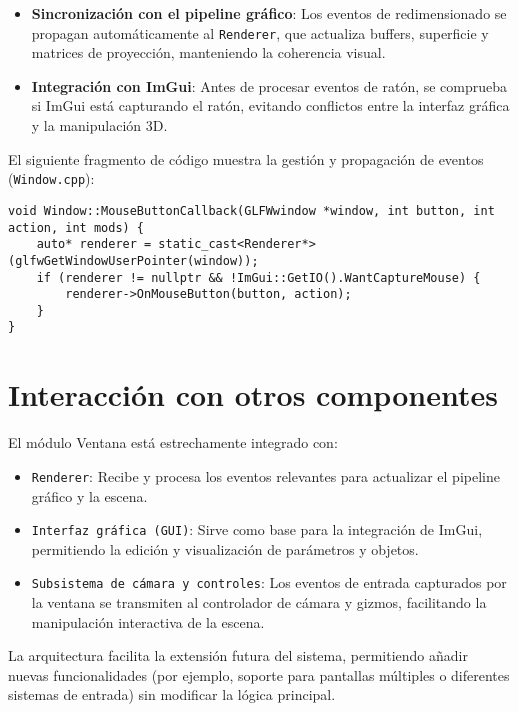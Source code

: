 \begin{itemize}
    \item \textbf{Sincronización con el pipeline gráfico}: Los eventos de redimensionado se propagan automáticamente al \texttt{Renderer}, que actualiza buffers, superficie y matrices de proyección, manteniendo la coherencia visual.
    \item \textbf{Integración con ImGui}: Antes de procesar eventos de ratón, se comprueba si ImGui está capturando el ratón, evitando conflictos entre la interfaz gráfica y la manipulación 3D.
\end{itemize}

El siguiente fragmento de código muestra la gestión y propagación de eventos
(\texttt{Window.cpp}):

\begin{verbatim}
void Window::MouseButtonCallback(GLFWwindow *window, int button, int action, int mods) {
    auto* renderer = static_cast<Renderer*>(glfwGetWindowUserPointer(window));
    if (renderer != nullptr && !ImGui::GetIO().WantCaptureMouse) {
        renderer->OnMouseButton(button, action);
    }
}
\end{verbatim}

\section{Interacción con otros componentes}

El módulo Ventana está estrechamente integrado con:

\begin{itemize}
    \item \texttt{Renderer}: Recibe y procesa los eventos relevantes para actualizar el pipeline gráfico y la escena.
    \item \texttt{Interfaz gráfica (GUI)}: Sirve como base para la integración de ImGui, permitiendo la edición y visualización de parámetros y objetos.
    \item \texttt{Subsistema de cámara y controles}: Los eventos de entrada capturados por la ventana se transmiten al controlador de cámara y gizmos, facilitando la manipulación interactiva de la escena.
\end{itemize}

La arquitectura facilita la extensión futura del sistema, permitiendo añadir
nuevas funcionalidades (por ejemplo, soporte para pantallas múltiples o
diferentes sistemas de entrada) sin modificar la lógica principal.
